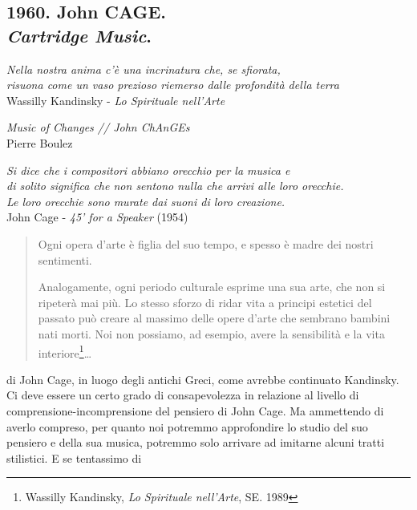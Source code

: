 
\subsection*{1960. John CAGE. \\ \emph{Cartridge Music}.}

	\begin{flushright}
		\textit{Nella nostra anima c'\`e una incrinatura che, se sfiorata, \\
		risuona come un vaso prezioso riemerso dalle profondit\`a della terra} \\
		Wassilly Kandinsky - \emph{Lo Spirituale nell'Arte}
	\end{flushright}

	\begin{flushright}
		\textit{Music of Changes // John ChAnGEs} \\
		Pierre Boulez
	\end{flushright}

	\begin{flushright}
		\textit{Si dice che i compositori abbiano orecchio per la musica e \\
		di solito significa che non sentono nulla che arrivi alle loro orecchie. \\
		Le loro orecchie sono murate dai suoni di loro creazione.} \\
		John Cage - \emph{45' for a Speaker} (1954)
	\end{flushright}

\bigskip


\begin{quote}
	Ogni opera d'arte \`e figlia del suo tempo, e spesso \`e madre dei nostri
	sentimenti.

	Analogamente, ogni periodo culturale esprime una sua arte, che non si ripeter\`a mai pi\`u.
	Lo stesso sforzo di ridar vita a principi estetici del passato pu\`o creare al massimo delle opere d'arte che sembrano bambini nati morti.
	Noi non possiamo, ad esempio, avere la sensibilit\`a e la vita interiore\footnote{Wassilly Kandinsky, \emph{Lo Spirituale nell'Arte}, SE. 1989}\ldots
\end{quote}

di John Cage, in luogo degli antichi Greci, come avrebbe continuato Kandinsky.
Ci deve essere un certo grado di consapevolezza in relazione al livello di
comprensione-incomprensione del pensiero di John Cage. Ma ammettendo di
averlo compreso, per quanto noi potremmo approfondire lo studio del suo
pensiero e della sua musica, potremmo solo arrivare ad imitarne alcuni tratti
stilistici. E se tentassimo di

